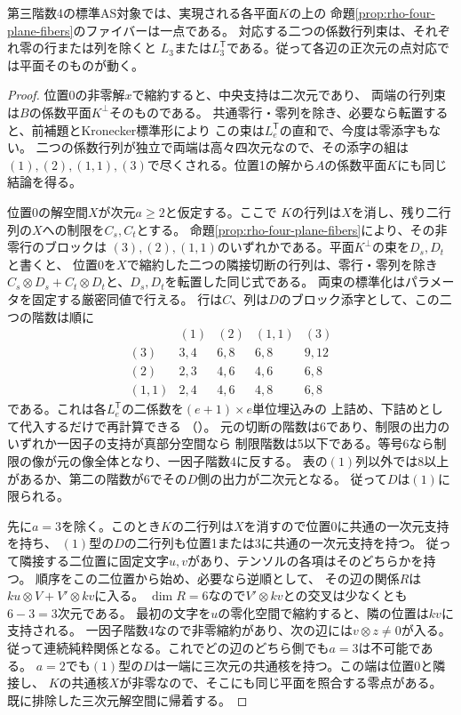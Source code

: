 \begin{theorem}[各照合平面での零点対の一意性]\label{thm:matched-plane-unique-pair}
第三階数4の標準AS対象では、実現される各平面$K$の上の
命題\ref{prop:rho-four-plane-fibers}のファイバーは一点である。
対応する二つの係数行列束は、それぞれ零の行または列を除くと
$L_3$または$L_3^{\mathsf T}$である。従って各辺の正次元の点対応では平面そのものが動く。
\end{theorem}
\begin{proof}
位置0の非零解$x$で縮約すると、中央支持は二次元であり、
両端の行列束は$B$の係数平面$K^\perp$そのものである。
共通零行・零列を除き、必要なら転置すると、前補題とKronecker標準形により
この束は$L_e^{\mathsf T}$の直和で、今度は零添字もない。
二つの係数行列が独立で両端は高々四次元なので、その添字の組は
$(1),(2),(1,1),(3)$で尽くされる。位置1の解から$A$の係数平面$K$にも同じ結論を得る。

位置0の解空間$X$が次元$a\ge2$と仮定する。ここで
$K$の行列は$X$を消し、残り二行列の$X$への制限を$C_s,C_t$とする。
命題\ref{prop:rho-four-plane-fibers}により、その非零行のブロックは
$(3),(2),(1,1)$のいずれかである。平面$K^\perp$の束を$D_s,D_t$と書くと、
位置0を$X$で縮約した二つの隣接切断の行列は、零行・零列を除き
$C_s\otimes D_s+C_t\otimes D_t$と、$D_s,D_t$を転置した同じ式である。
両束の標準化はパラメータを固定する厳密同値で行える。
行は$C$、列は$D$のブロック添字として、この二つの階数は順に
\[
\begin{array}{c|rrrr}
 & (1)&(2)&(1,1)&(3)\\\hline
 (3)&3,4&6,8&6,8&9,12\\
 (2)&2,3&4,6&4,6&6,8\\
 (1,1)&2,4&4,6&4,8&6,8
\end{array}
\]
である。これは各$L_e^{\mathsf T}$の二係数を$(e+1)\times e$単位埋込みの
上詰め、下詰めとして代入するだけで再計算できる
（）。
元の切断の階数は6であり、制限の出力のいずれか一因子の支持が真部分空間なら
制限階数は5以下である。等号6なら制限の像が元の像全体となり、一因子階数4に反する。
表の$(1)$列以外では8以上があるか、第二の階数が6でその$D$側の出力が二次元となる。
従って$D$は$(1)$に限られる。

先に$a=3$を除く。このとき$K$の二行列は$X$を消すので位置0に共通の一次元支持を持ち、
$(1)$型の$D$の二行列も位置1または3に共通の一次元支持を持つ。
従って隣接する二位置に固定文字$u,v$があり、テンソルの各項はそのどちらかを持つ。
順序をこの二位置から始め、必要なら逆順として、
その辺の関係$R$は$ku\otimes V+V'\otimes kv$に入る。
$\dim R=6$なので$V'\otimes kv$との交叉は少なくとも$6-3=3$次元である。
最初の文字を$u$の零化空間で縮約すると、隣の位置は$kv$に支持される。
一因子階数4なので非零縮約があり、次の辺には$v\otimes z\ne0$が入る。
従って連続純粋関係となる。これでどの辺のどちら側でも$a=3$は不可能である。
$a=2$でも$(1)$型の$D$は一端に三次元の共通核を持つ。この端は位置0と隣接し、
$K$の共通核$X$が非零なので、そこにも同じ平面を照合する零点がある。
既に排除した三次元解空間に帰着する。


\end{proof}
